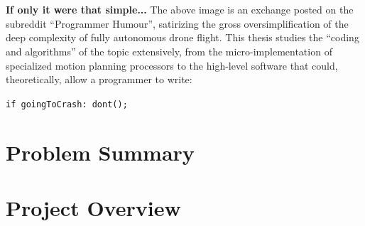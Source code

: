 
\begin{figure}[H]
\begin{center}
\\
\\
\end{center}
\end{figure}


\textbf{If only it were that simple...} The above image is an exchange posted on the subreddit ``Programmer Humour'', satirizing the gross oversimplification of the deep complexity of fully autonomous drone flight. This thesis studies the ``coding and algorithms'' of the topic extensively, from the micro-implementation of specialized motion planning processors to the high-level software that could, theoretically, allow a programmer to write: 

    \begin{center}
    \texttt{if goingToCrash: dont();}
    \end{center}

\section{Problem Summary}
    

\newpage
\section{Project Overview}
\label{section:projectOverview}
    



\newpage